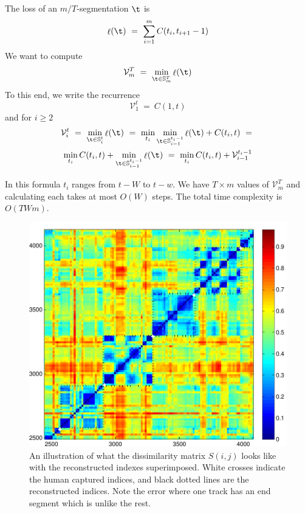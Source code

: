 \documentclass[twocolumn]{article}
\DeclareMathOperator{\loss}{\ell}
\newcommand{\segs}{\mathbb S}
\newcommand{\best}{\mathcal V}
\begin{document}
The loss of an $m/T$-segmentation $\t$ is 
\[
\loss(\t) 
~=~
\sum_{i=1}^m C(t_i, t_{i+1}-1)
\]
We want to compute
\[
\best^T_m ~=~ \min_{\t \in \segs^T_m} \loss(\t)
\]
To this end, we write the recurrence
\begin{equation*}
\best^t_1 ~=~ C(1, t) 
\end{equation*}
and for $i\ge2$
\begin{multline*}
\best^t_i ~=~
\min_{\t \in \segs^t_i} \loss(\t)
~=~ \min_{t_i} \min_{\t \in \segs^{t_i-1}_{i-1}} \loss(\t) + C(t_i, t)~=~  \\
\min_{t_i} C(t_i, t) + \min_{\t \in \segs^{t_i-1}_{i-1}} \loss(\t) 
~=~ \min_{t_i} C(t_i, t) + \best^{t_i-1}_{i-1}
\end{multline*}

In this formula $t_i$ ranges from $t-W$ to $t-w$. We have $T \times m$ values of $\best^T_m$ and calculating each takes at most $O(W)$ steps. The total time complexity is $O(TWm)$.

\begin{figure}[t]
\centering
\includegraphics[width=\textwidth]{images/simmat_preds}

\caption{An illustration of what the dissimilarity matrix $S(i,j)$ looks like with the reconstructed indexes superimposed. White crosses indicate the human captured indices, and black dotted lines are the reconstructed indices. Note the error where one track has an end segment which is unlike the rest. }
\label{fig:predictions}
\end{figure} 
\end{document}
